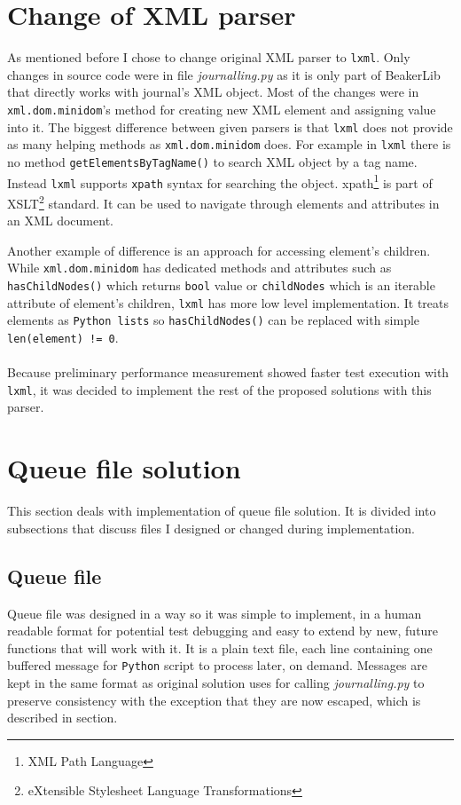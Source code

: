 \section{Change of XML parser}
As mentioned before I chose to change original XML parser to \texttt{lxml}. Only changes in source code were in file \textit{journalling.py} as it is only part of BeakerLib that directly works with journal's XML object. 
Most of the changes were in \texttt{xml.dom.minidom}'s method for creating new XML element and assigning value into it.
The biggest difference between given parsers is that \texttt{lxml} does not provide as many helping methods as \texttt{xml.dom.minidom} does.
For example in \texttt{lxml}  there is no method \texttt{getElementsByTagName()} to search XML object by a tag name. Instead \texttt{lxml} supports \texttt{xpath}\cite{xpath} syntax for searching the object. xpath\footnote{XML Path Language} is part of XSLT\footnote{eXtensible Stylesheet Language Transformations} standard. It can be used to navigate through elements and attributes in an XML document.

Another example of difference is an approach for accessing element's children. While \texttt{xml.dom.minidom} has dedicated methods and attributes such as \texttt{hasChildNodes()} which returns \texttt{bool} value or \texttt{childNodes} which is an iterable attribute of element's children, \texttt{lxml} has more low level implementation. It treats elements as \texttt{Python lists} so \texttt{hasChildNodes()} can be replaced with simple \texttt{len(element) != 0}.
\\
\\
Because preliminary performance measurement showed faster test execution with \texttt{lxml}, it was decided to implement the rest of the proposed solutions with this parser.

\section{Queue file solution}
This section deals with implementation of queue file solution. It is divided into subsections that discuss files I designed or changed during implementation. 

\subsection{Queue file}
Queue file was designed in a way so it was simple to implement, in a human readable format for potential test debugging and easy to extend by new, future functions that will work with it. 
It is a plain text file, each line containing one buffered message for \texttt{Python} script to process later, on demand. Messages are kept in the same format as original solution uses for calling \textit{journalling.py} to preserve consistency with the exception that they are now escaped, which is described in section.

